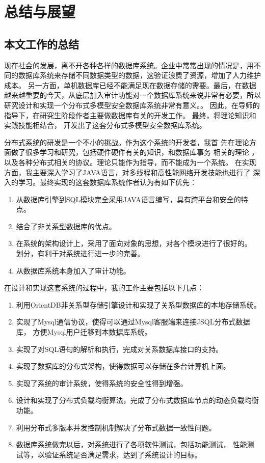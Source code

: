 \chapter{总结与展望}
\section{本文工作的总结}
现在社会的发展，离不开各种各样的数据库系统。企业中常常出现的情况是，用不同的数据库系统来存储不同数据类型的数据，这验证浪费了资源，增加了人力维护成本。
另一方面，单机数据库已经不能满足现在数据存储的需要。最后，在数据越来越重要的今天，从底层加入审计功能对一个数据库系统来说非常有必要，所以研究设计和实现一个分布式多模型安全数据库系统非常有意义。。
因此，在导师的
指导下，在研究生阶段作者主要做数据库有关的开发工作。
最终，将理论知识和实践技能相结合，
开发出了这套分布式多模型安全数据库系统。

分布式系统的研发是一个不小的挑战。作为这个系统的开发者，我首
先在理论方面做了很多学习和研究，包括硬件硬件有关的知识，和数据库事务
相关的理论
，以及各种分布式相关的协议。理论只能作为指导，而不能成为一个系统。
在实现方面，我主要深入学习了JAVA语言，对多线程和高性能网络开发技能也进行了
深入的学习。最终实现的这套数据库系统作者认为有如下优先：
\begin{enumerate}[fullwidth,itemindent=2em]
	\item 从数据库引擎到SQL模块完全采用JAVA语言编写，具有跨平台和安全的特点。
	\item 结合了非关系型数据库的优点。
	\item 在系统的架构设计上，采用了面向对象的思想，对各个模块进行了很好的。
	划分，有利于对系统进行进一步的完善。
	\item 从数据库系统本身加入了审计功能。
\end{enumerate}

在设计和实现这套系统的过程中，我的工作主要包括以下几点：

\begin{enumerate}[fullwidth,itemindent=2em]
	\item 利用OrientDB非关系型存储引擎设计和实现了关系型数据库的本地存储系统。
	\item 实现了Mysql通信协议，使得可以通过Mysql客服端来连接JSQL分布式数据库，
	方便Mysql用户迁移到本数据库系统。
	\item 实现了对SQL语句的解析和执行，完成对关系数据库接口的支持。
	\item 实现了数据库的分布式架构，使得数据可以存储在多台计算机上面。
	\item 实现了系统的审计系统，使得系统的安全性得到增强。
	\item 设计和实现了分布式负载均衡算法，完成了分布式数据库节点的动态负载均衡功能。
	\item 利用分布式多版本并发控制机制解决了分布式数据一致性问题。
	\item 数据库系统做完以后，对系统进行了各项软件测试，包括功能测试，
	性能测试等，以验证系统是否满足需求，达到了系统设计的目标。
\end{enumerate}

